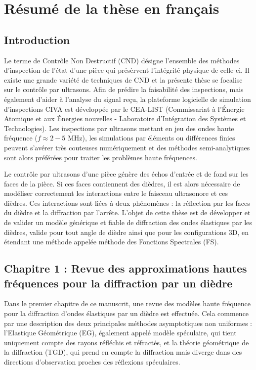 \chapter[][Résumé de la thèse en français]{Résumé de la thèse en français}

\section[Introduction]{Introduction}

Le terme de Contrôle Non Destructif (CND) désigne l'ensemble des méthodes d'inspection de l'état d'une pièce qui présèrvent l'intégrité physique de celle-ci. Il existe une grande variété de techniques de CND et la présente thèse se focalise sur le contrôle par ultrasons. Afin de prédire la faisabilité des inspections, mais également d'aider à l'analyse du signal reçu, la plateforme logicielle de simulation d'inspections CIVA est développée par le CEA-LIST (Commissariat à l’Énergie Atomique et aux Énergies nouvelles - Laboratoire d’Intégration des Systèmes et Technologies). Les inspections par ultrasons mettant en jeu des ondes haute fréquence ($f\approx2-5$ MHz), les simulations par éléments ou différences finies peuvent s'avérer très couteuses numériquement et des méthodes semi-analytiques sont alors préférées pour traiter les problèmes haute fréquences.

Le contrôle par ultrasons d'une pièce génère des échos d'entrée et de fond sur les faces de la pièce. Si ces faces contiennent des dièdres, il est alors nécessaire de modéliser correctement les interactions entre le faisceau ultrasonore et ces dièdres. Ces interactions sont liées à deux phénomènes : la réflection par les faces du dièdre et la diffraction par l'arrête. L'objet de cette thèse est de développer et de valider un modèle générique et fiable de diffraction des ondes élastiques par les dièdres, valide pour tout angle de dièdre ainsi que pour les configurations 3D, en étendant une méthode appelée méthode des Fonctions Spectrales (FS).


\section[Résumé du chapitre 1]{Chapitre 1 : Revue des approximations hautes fréquences pour la diffraction par un dièdre}

Dans le premier chapitre de ce manuscrit, une revue des modèles haute fréquence pour la diffraction d'ondes élastiques par un dièdre est effectuée. Cela commence par une description des deux principales méthodes asymptotiques non uniformes : l'Elastique Géométrique (EG), également appelé modèle spéculaire, qui tient uniquement compte des rayons réfléchis et réfractés, et la théorie géométrique de la diffraction (TGD), qui prend en compte la diffraction mais diverge dans des directions d'observation proches des réflexions spéculaires. 

